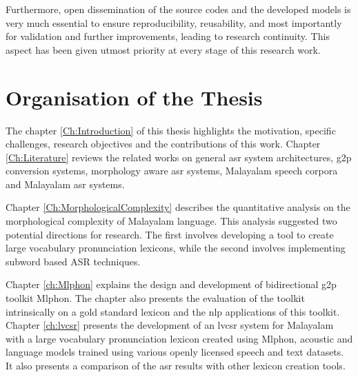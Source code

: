 Furthermore, open dissemination of the source codes and the developed models is very much essential to ensure reproducibility, reusability, and most importantly for validation and further improvements, leading to research continuity. This aspect 
has been given utmost priority at every stage of this research work.



\section{Organisation of the Thesis}

The chapter \ref{Ch:Introduction} of this thesis highlights the motivation,
specific challenges, research objectives and the contributions of this work.
Chapter \ref{Ch:Literature} reviews the related works on general \gls{asr}
system architectures, \gls{g2p} conversion systems, morphology aware \gls{asr}
systems, Malayalam speech corpora and Malayalam \gls{asr} systems.

Chapter \ref{Ch:MorphologicalComplexity} describes the quantitative analysis on
the morphological complexity of Malayalam language. This analysis suggested two potential directions for research. The first involves developing a tool to create large vocabulary pronunciation lexicons, while the second involves implementing subword based ASR techniques. 

Chapter \ref{ch:Mlphon} explains the design and development of bidirectional \gls{g2p} toolkit Mlphon. The chapter also presents the evaluation of the toolkit intrinsically on a gold standard lexicon and the \gls{nlp} applications of this toolkit. Chapter \ref{ch:lvcsr} presents the development of an \gls{lvcsr} system for
Malayalam with a large vocabulary pronunciation lexicon created using Mlphon,
acoustic and language models trained using various openly licensed speech and
text datasets. It also presents a comparison of the \gls{asr} results with
other lexicon creation tools.

